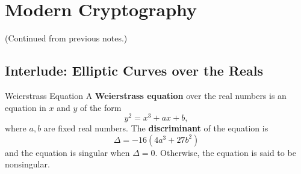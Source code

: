 \documentclass[letterpaper]{article}
\begin{document}
\section{Modern Cryptography}
(Continued from previous notes.)

\subsection{Interlude: Elliptic Curves over the Reals}
\begin{definition}{Weierstrass Equation}{}
    A \textbf{Weierstrass equation} over the real numbers is an equation in $x$ and $y$ of the form 
    \[y^2 = x^3 + ax + b,\]
    where $a, b$ are fixed real numbers. The \textbf{discriminant} of the equation is 
    \[\Delta = -16(4a^3 + 27b^2)\]
    and the equation is singular when $\Delta = 0$. Otherwise, the equation is said to be nonsingular. 
\end{definition}
\end{document}

